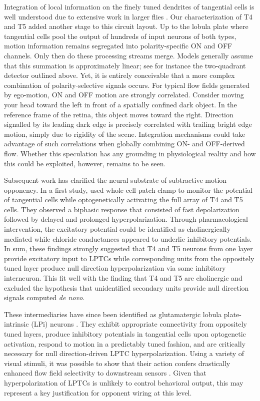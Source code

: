 Integration of local information on the finely tuned dendrites of tangential cells is well understood due to extensive work in larger flies \citep{Borst:2010fk}. Our characterization of T4 and T5 added another stage to this circuit layout. Up to the lobula plate where tangential cells pool the output of hundreds of input neurons of both types, motion information remains segregated into polarity-specific ON and OFF channels. Only then do these processing streams merge. Models generally assume that this summation is approximately linear; see for instance the two-quadrant detector outlined above. Yet, it is entirely conceivable that a more complex combination of polarity-selective signals occurs. For typical flow fields generated by ego-motion, ON and OFF motion are strongly correlated. Consider moving your head toward the left in front of a spatially confined dark object. In the reference frame of the retina, this object moves toward the right. Direction signalled by its leading dark edge is precisely correlated with trailing bright edge motion, simply due to rigidity of the scene. Integration mechanisms could take advantage of such correlations when globally combining ON- and OFF-derived flow. Whether this speculation has any grounding in physiological reality and how this could be exploited, however, remains to be seen.

Subsequent work has clarified the neural substrate of subtractive motion opponency. In a first study, \citet{Mauss:2014is} used whole-cell patch clamp to monitor the potential of tangential cells while optogenetically activating the full array of T4 and T5 cells. They observed a biphasic response that consisted of fast depolarization followed by delayed and prolonged hyperpolarization. Through pharmacological intervention, the excitatory potential could be identified as cholinergically mediated while chloride conductances appeared to underlie inhibitory potentials. In sum, these findings strongly suggested that T4 and T5 neurons from one layer provide excitatory input to LPTCs while corresponding units from the oppositely tuned layer produce null direction hyperpolarization via some inhibitory interneuron. This fit well with the finding that T4 and T5 are cholinergic \citep{Raghu:2011iy,Shinomiya:2014dx,Pankova:2016aa} and excluded the hypothesis that unidentified secondary units provide null direction signals computed \textit{de novo}.

These intermediaries have since been identified as glutamatergic lobula plate-intrinsic (LPi) neurons \citep{Mauss:2015kj}. They exhibit appropriate connectivity from oppositely tuned layers, produce inhibitory potentials in tangential cells upon optogenetic activation, respond to motion in a predictably tuned fashion, and are critically necessary for null direction-driven LPTC hyperpolarization. Using a variety of visual stimuli, it was possible to show that their action confers drastically enhanced flow field selectivity to downstream sensors \citep[see][]{Krapp:1996}. Given that hyperpolarization of LPTCs is unlikely to control behavioral output, this may represent a key justification for opponent wiring at this level.

